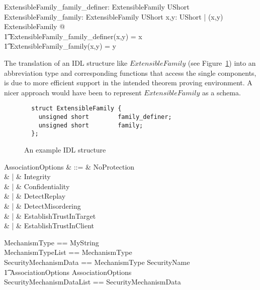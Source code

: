 \begin{axdef}
  ExtensibleFamily\_family\_definer: ExtensibleFamily \fun UShort\\
  ExtensibleFamily\_family: ExtensibleFamily \fun UShort
  \where
  \forall x,y: UShort | (x,y) \in ExtensibleFamily @ \\
  \t1 ExtensibleFamily\_family\_definer(x,y) = x  \\
  \t1 \land ExtensibleFamily\_family(x,y) = y
\end{axdef}
The translation of an IDL structure like $ExtensibleFamily$ (see
Figure~\ref{fig:extFam}) into an abbreviation type and corresponding functions
that access the single components, is due to more efficient support in the
intended theorem proving environment.  A nicer approach would have been to
represent $ExtensibleFamily$ as a schema.
\begin{figure}[ht]
  \begin{center}
    \begin{minipage}{9cm}
\begin{verbatim}
  struct ExtensibleFamily {
    unsigned short        family_definer;
    unsigned short        family;
  };
\end{verbatim}
    \end{minipage}
    \caption{An example IDL structure}
    \label{fig:extFam}
  \end{center}
\end{figure}
\begin{syntax}
  AssociationOptions & ::= & NoProtection\\
  & | & Integrity\\
  & | & Confidentiality\\
  & | & DetectReplay\\
  & | & DetectMisordering\\
  & | & EstablishTrustInTarget\\
  & | & EstablishTrustInClient
\end{syntax}
  
\begin{zed}
  MechanismType == MyString \\
  MechanismTypeList == \seq MechanismType \\
  SecurityMechanismData == MechanismType \cross SecurityName \cross \\
  \t1 AssociationOptions \cross AssociationOptions \\
  SecurityMechanismDataList == \seq SecurityMechanismData \\
\end{zed}
